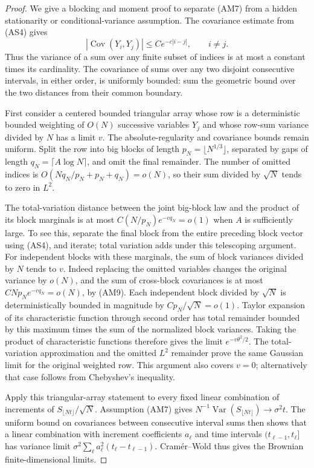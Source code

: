\documentclass[11pt]{article}
\theoremstyle{definition}\newtheorem{definition}[theorem]{Definition}
\theoremstyle{remark}\newtheorem{remark}[theorem]{Remark}
\begin{document}
\begin{proof}
We give a blocking and moment proof to separate (AM7) from a hidden
stationarity or conditional-variance assumption. The covariance estimate
from (AS4) gives
\[
 |\operatorname{Cov}(Y_i,Y_j)|\le C e^{-c|i-j|},\qquad i\ne j.
 \tag{AM9}
\]
Thus the variance of a sum over any finite subset of indices is at most
a constant times its cardinality. The covariance of sums over any two
disjoint consecutive intervals, in either order, is uniformly bounded:
sum the geometric bound over the two distances from their common boundary.

First consider a centered bounded triangular array whose row is a
deterministic bounded weighting of $O(N)$ successive variables $Y_j$
and whose row-sum
variance divided by $N$ has a limit $v$. The absolute-regularity and
covariance bounds remain uniform. Split the row into big blocks of length
$p_N=\lfloor N^{1/3}\rfloor$, separated by gaps of length
$q_N=\lceil A\log N\rceil$, and omit the final remainder. The number of
omitted indices is $O(Nq_N/p_N+p_N+q_N)=o(N)$, so their sum divided by
$\sqrt N$ tends to zero in $L^2$.

The total-variation distance between the joint big-block law and the
product of its block marginals is at most
$C(N/p_N)e^{-cq_N}=o(1)$ when $A$ is sufficiently large. To see this,
separate the final block from the entire preceding block vector using
(AS4), and iterate; total variation adds under this telescoping argument.
For independent blocks with these marginals, the sum of block variances
divided by $N$ tends to $v$. Indeed replacing the omitted variables
changes the original variance by $o(N)$, and the sum of cross-block
covariances is at most $CNp_Ne^{-cq_N}=o(N)$, by (AM9).
Each independent block divided by $\sqrt N$ is deterministically bounded
in magnitude by $Cp_N/\sqrt N=o(1)$. Taylor expansion of its characteristic
function through second order has total remainder bounded by this maximum
times the sum of the normalized block variances. Taking the product of
characteristic functions therefore gives the limit $e^{-v\theta^2/2}$.
The total-variation approximation and the omitted $L^2$ remainder prove
the same Gaussian limit for the original weighted row. This argument also
covers $v=0$; alternatively that case follows from Chebyshev's inequality.

Apply this triangular-array statement to every fixed linear combination
of increments of $S_{\lfloor Nt\rfloor}/\sqrt N$. Assumption (AM7) gives
$N^{-1}\operatorname{Var}(S_{\lfloor Nt\rfloor})\to\sigma^2t$.
The uniform bound on covariances between consecutive interval sums then
shows that a linear combination with increment coefficients $a_\ell$
and time intervals $(t_{\ell-1},t_\ell]$ has variance limit
$\sigma^2\sum_\ell a_\ell^2(t_\ell-t_{\ell-1})$.
Cram\'er--Wold thus gives the Brownian finite-dimensional limits.


\end{proof}
\end{document}
